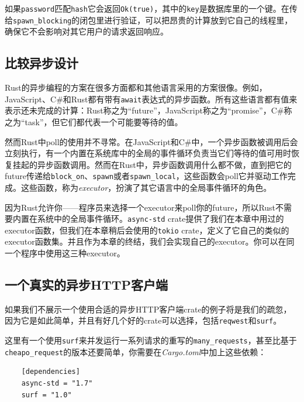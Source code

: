 如果\texttt{password}匹配\texttt{hash}它会返回\texttt{Ok(true)}，其中的\texttt{key}是数据库里的一个键。在传给\texttt{spawn\_blocking}的闭包里进行验证，可以把昂贵的计算放到它自己的线程里，确保它不会影响对其它用户的请求返回响应。

\subsection{比较异步设计}
Rust的异步编程的方案在很多方面都和其他语言采用的方案很像。例如，JavaScript、C\#和Rust都有带有\texttt{await}表达式的异步函数。所有这些语言都有值来表示还未完成的计算：Rust称之为“future”，JavaScript称之为“promise”，C\#称之为“task”，但它们都代表一个可能要等待的值。

然而Rust中poll的使用并不寻常。在JavaScript和C\#中，一个异步函数被调用后会立刻执行，有一个内置在系统库中的全局的事件循环负责当它们等待的值可用时恢复挂起的异步函数调用。然而在Rust中，异步函数调用什么都不做，直到把它的future传递给\texttt{block\_on}、\texttt{spawn}或者\texttt{spawn\_local}，这些函数会poll它并驱动工作完成。这些函数，称为\emph{executor}，扮演了其它语言中的全局事件循环的角色。

因为Rust允许你——程序员来选择一个executor来poll你的future，所以Rust不需要内置在系统中的全局事件循环。\texttt{async-std} crate提供了我们在本章中用过的executor函数，但我们在本章稍后会使用的\texttt{tokio} crate，定义了它自己的类似的executor函数集。并且作为本章的终结，我们会实现自己的executor。你可以在同一个程序中使用这三种executor。

\subsection{一个真实的异步HTTP客户端}
如果我们不展示一个使用合适的异步HTTP客户端crate的例子将是我们的疏忽，因为它是如此简单，并且有好几个好的crate可以选择，包括\texttt{reqwest}和\texttt{surf}。

这里有一个使用\texttt{surf}来并发运行一系列请求的重写的\texttt{many\_requests}，甚至比基于\\
\texttt{cheapo\_request}的版本还要简单，你需要在\emph{Cargo.toml}中加上这些依赖：
\begin{verbatim}
    [dependencies]
    async-std = "1.7"
    surf = "1.0"
\end{verbatim}

